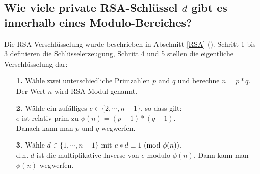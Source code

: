 \begin{refsegment}
\newpage
\hypertarget{NumberTheory_Sage_Number-of-RSA-keys}{}
\subsection[Wie viele private RSA-Schlüssel d gibt es innerhalb eines Modulo-Bereiches?]
{Wie viele private RSA-Schlüs\discretionary{-}{}{}sel $d$ gibt es innerhalb eines Modulo-Be\-rei\-ches?}

\label{l:NumberTheory_Sage_Number-of-RSA-keys}{}

Die RSA-Verschlüsselung wurde beschrieben in Abschnitt \ref{RSA} (\glqq {}\grqq).
Schritt 1 bis 3 definieren die Schlüsselerzeugung, Schritt 4 und 5 stellen die
eigentliche Verschlüsselung dar:
\begin{itemize}
  \item[\textbf{1.}] Wähle zwei unterschiedliche Primzahlen $p$ and $q$
                  und berechne $n = p*q$.\\
                  Der Wert $n$ wird RSA-Modul genannt.

  \item[\textbf{2.}] Wähle ein zufälliges $e \in \{2, \cdots, n-1\}$, so dass gilt:\\
                  $e$ ist relativ prim
                  zu $\phi(n) = (p-1)*(q-1)$.\\
                  Danach kann man $p$ und $q$ \glqq wegwerfen\grqq.

  \item[\textbf{3.}] Wähle $d \in \{1, \cdots, n-1\}$ mit $e*d \equiv 1
                  {\rm ~(mod~} \phi(n))$,\\
		  d.h. $d$ ist die multiplikative Inverse von $e$ modulo $\phi(n)$.
		  Dann kann man $\phi(n)$ \glqq wegwerfen\grqq.


\end{itemize}
\end{refsegment}
